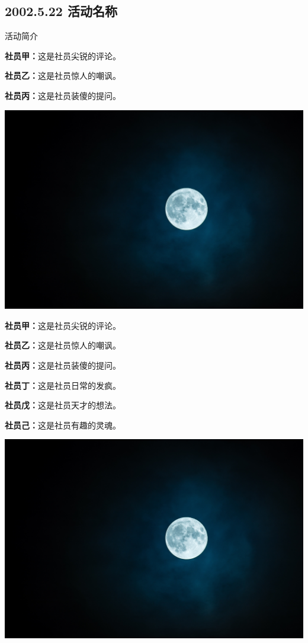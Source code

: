 \documentclass[9pt]{book}
\begin{document}
\begin{multicols*}{2}

\subsection*{2002.5.22 活动名称}
活动简介

{\bfseries 社员甲：}这是社员尖锐的评论。

{\bfseries 社员乙：}这是社员惊人的嘲讽。

{\bfseries 社员丙：}这是社员装傻的提问。

\begin{center} 
    \includegraphics[width=\columnwidth]{figure/images/short.jpg}
    \label{fig:1}
\end{center}
\vspace{-1.25\baselineskip}

{\bfseries 社员甲：}这是社员尖锐的评论。

{\bfseries 社员乙：}这是社员惊人的嘲讽。

{\bfseries 社员丙：}这是社员装傻的提问。

{\bfseries 社员丁：}这是社员日常的发疯。

{\bfseries 社员戊：}这是社员天才的想法。

{\bfseries 社员己：}这是社员有趣的灵魂。


\begin{center}
    \includegraphics[width=\columnwidth]{figure/images/short.jpg}
    \label{fig:2}
\end{center}


\end{multicols*}
\end{document}
